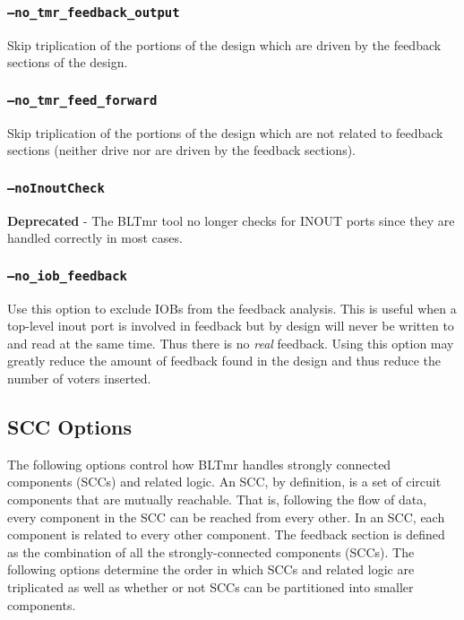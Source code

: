 \documentclass[english]{article}
\begin{document}
\subsubsection{\texttt{--no\_tmr\_feedback\_output}}
Skip triplication of the portions of the design which are driven by the 
feedback sections of the design.

\subsubsection{\texttt{--no\_tmr\_feed\_forward}}
Skip triplication of the portions of the design which are not related to 
feedback sections (neither drive nor are driven by the feedback sections).

\subsubsection{\texttt{--noInoutCheck}}
\textbf{Deprecated} - The BLTmr tool no longer checks for INOUT ports since they
are handled correctly in most cases.

\subsubsection{\texttt{--no\_iob\_feedback}}
Use this option to exclude IOBs from the feedback analysis. This is useful when
a top-level inout port is involved in feedback but by design will never be 
written to and read at the same time. Thus there is no \emph{real} feedback.
Using this option may greatly reduce the amount of feedback found in the design
and thus reduce the number of voters inserted.

\subsection{SCC Options}
The following options control how BLTmr handles strongly connected components 
(SCCs) and related logic. An SCC, by definition, is a set of circuit components 
that are mutually reachable. That is, following the flow of data, every 
component in the SCC can be reached from every other. In an SCC, each component 
is related to every other component. The feedback section is defined as the 
combination of all the strongly-connected components (SCCs). The following 
options determine the order in which SCCs and related logic are triplicated as 
well as whether or not SCCs can be partitioned into smaller components.
\end{document}
